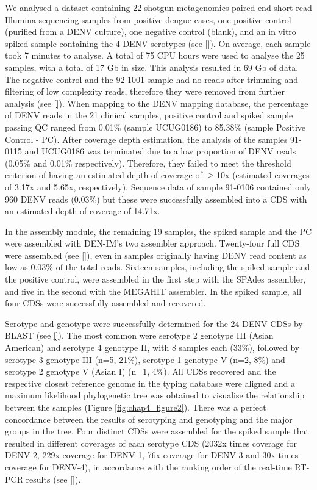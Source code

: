 We analysed a dataset containing 22 shotgun metagenomics paired-end short-read Illumina sequencing samples from positive dengue cases, one positive control (purified from a DENV culture), one negative control (blank), and an in vitro spiked sample containing the 4 DENV serotypes (see \ref{}). On average, each sample took 7 minutes to analyse. A total of 75 CPU hours were used to analyse the 25 samples, with a total of 17 Gb in size. This analysis resulted in 69 Gb of data. 
The negative control and the 92-1001 sample had no reads after trimming and filtering of low complexity reads, therefore they were removed from further analysis (see \ref{}). When mapping to the DENV mapping database, the percentage of DENV reads in the 21 clinical samples, positive control and spiked sample passing QC ranged from 0.01\% (sample UCUG0186) to 85.38\% (sample Positive Control - PC). After coverage depth estimation, the analysis of the samples 91-0115 and UCUG0186 was terminated due to a low proportion of DENV reads (0.05\% and 0.01\% respectively). Therefore, they failed to meet the threshold criterion of having an estimated depth of coverage of $\geq$10x (estimated coverages of 3.17x and 5.65x, respectively). Sequence data of sample 91-0106 contained only 960 DENV reads (0.03\%) but these were successfully assembled into a CDS with an estimated depth of coverage of 14.71x.

In the assembly module, the remaining 19 samples, the spiked sample and the PC were assembled with DEN-IM’s two assembler approach. Twenty-four full CDS were assembled (see \ref{}), even in samples originally having DENV read content as low as 0.03\% of the total reads. Sixteen samples, including the spiked sample and the positive control, were assembled in the first step with the SPAdes assembler, and five in the second with the MEGAHIT assembler. In the spiked sample, all four CDSs were successfully assembled and recovered.

Serotype and genotype were successfully determined for the 24 DENV CDSs by BLAST (see \ref{}). The most common were serotype 2 genotype III (Asian American) and serotype 4 genotype II, with 8 samples each (33\%), followed by serotype 3 genotype III (n=5, 21\%), serotype 1 genotype V (n=2, 8\%) and serotype 2 genotype V (Asian I) (n=1, 4\%). All CDSs recovered and the respective closest reference genome in the typing database were aligned and a maximum likelihood phylogenetic tree was obtained to visualise the relationship between the samples (Figure \ref{fig:chap4_figure2}). There was a perfect concordance between the results of serotyping and genotyping and the major groups in the tree.
Four distinct CDSs were assembled for the spiked sample that resulted in different coverages of each serotype CDS (2032x times coverage for DENV-2, 229x coverage for DENV-1, 76x coverage for DENV-3 and 30x times coverage for DENV-4), in accordance with the ranking order of the real-time RT-PCR results (see \ref{}).

